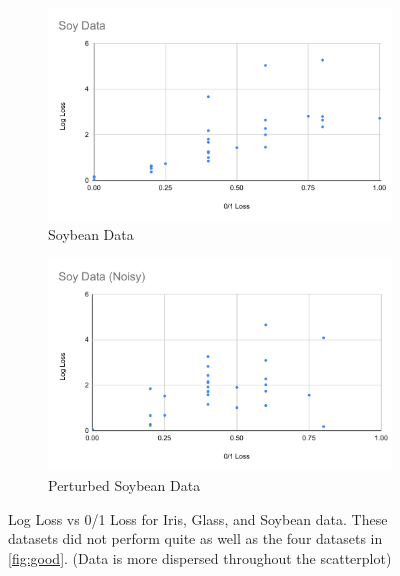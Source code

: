 \documentclass[twoside,11pt]{article}
\begin{document}
\begin{figure}[h!]
   \begin{subfigure}[b]{0.45\linewidth}
    \includegraphics[width=\linewidth]{images/Soy.pdf}
    \caption{Soybean Data}
  \end{subfigure}
  \begin{subfigure}[b]{0.45\linewidth}
    \includegraphics[width=\linewidth]{images/Soy(noise).pdf}
    \caption{Perturbed Soybean Data}
  \end{subfigure}
  
  \caption{Log Loss vs 0/1 Loss for Iris, Glass, and Soybean data. These datasets did not perform quite as well as the four datasets in \ref{fig:good}. (Data is more dispersed throughout the scatterplot)}
  \label{fig:ugly}
\end{figure}
\end{document}
